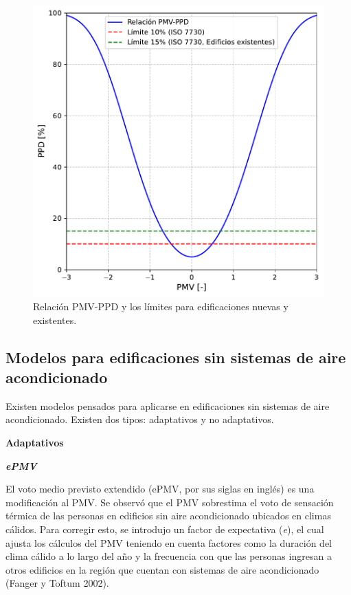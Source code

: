 \documentclass[
  12pt,
  letterpaper,
  DIV=11,
  numbers=noendperiod]{scrreport}
\begin{document}
\begin{figure}

{\centering \includegraphics{Capitulos/confort_termico_files/figure-pdf/fig-pmvppd-output-1.pdf}

}

\caption{\label{fig-pmvppd}Relación PMV-PPD y los límites para
edificaciones nuevas y existentes.}

\end{figure}

\hypertarget{modelos-para-edificaciones-sin-sistemas-de-aire-acondicionado}{%
\subsection{Modelos para edificaciones sin sistemas de aire
acondicionado}\label{modelos-para-edificaciones-sin-sistemas-de-aire-acondicionado}}

Existen modelos pensados para aplicarse en edificaciones sin sistemas de
aire acondicionado. Existen dos tipos: adaptativos y no adaptativos.

\textbf{Adaptativos}

\textbf{\emph{ePMV}}

El voto medio previsto extendido (ePMV, por sus siglas en inglés) es una
modificación al PMV. Se observó que el PMV sobrestima el voto de
sensación térmica de las personas en edificios sin aire acondicionado
ubicados en climas cálidos. Para corregir esto, se introdujo un factor
de expectativa (\emph{e}), el cual ajusta los cálculos del PMV teniendo
en cuenta factores como la duración del clima cálido a lo largo del año
y la frecuencia con que las personas ingresan a otros edificios en la
región que cuentan con sistemas de aire acondicionado (Fanger y Toftum
2002).
\end{document}
